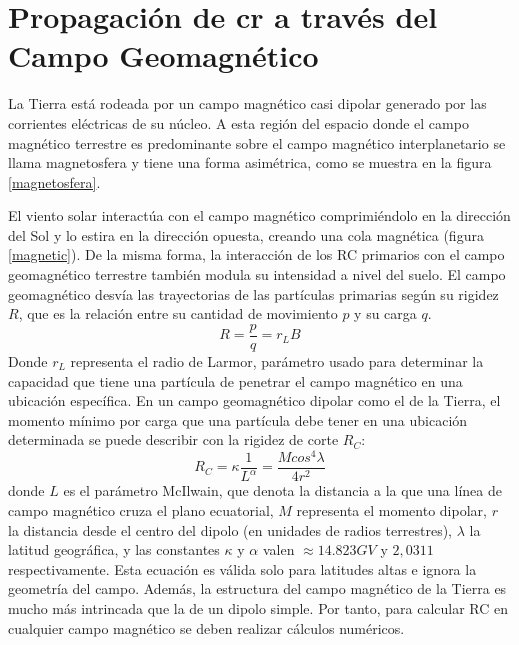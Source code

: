 \section{Propagación de \gls{cr} a través del Campo Geomagnético}

La Tierra está rodeada por un campo magnético casi dipolar generado por las corrientes eléctricas de su núcleo. A esta región del espacio donde el campo magnético terrestre es predominante sobre el campo magnético interplanetario se llama magnetosfera y tiene una forma asimétrica, como se muestra en la figura \ref{magnetosfera}. 

El viento solar interactúa con el campo magnético comprimiéndolo en la dirección del Sol y lo estira en la dirección opuesta, creando una cola magnética (figura \ref{magnetic}).  De la misma forma, la interacción de los RC primarios con el campo geomagnético terrestre también modula su intensidad a nivel del suelo. El campo geomagnético desvía las trayectorias de las partículas primarias según su rigidez $R$, que es la relación entre su cantidad de movimiento $p$ y su carga $q$. 
\begin{equation}
    R=\frac{p}{q}=r_{L}B
\end{equation}
Donde $r_L$ representa el radio de Larmor, parámetro usado para determinar la capacidad que tiene una partícula de penetrar el campo magnético en una ubicación específica. En un campo geomagnético dipolar como el de la Tierra, el momento mínimo por carga que una partícula debe tener en una ubicación determinada se puede describir con la rigidez de corte $R_C$:
\begin{equation}
    R_C=\kappa\frac{1}{L^{\alpha}}
    = \frac{M cos^{4}\lambda}{4r^{2}}
\end{equation}
donde $L$ es el parámetro McIlwain, que denota la distancia a la que una línea de campo magnético cruza el plano ecuatorial, $M$ representa el momento dipolar, $r$ la distancia desde el centro del dipolo (en unidades de radios terrestres), $\lambda$ la latitud geográfica, y las constantes $\kappa$ y $\alpha$ valen $\approx 14.823GV$ y  $2,0311$ respectivamente. Esta ecuación es válida solo para latitudes altas e ignora la geometría del campo. Además, la estructura del campo magnético de la Tierra es mucho más intrincada que la de un dipolo simple. Por tanto, para calcular RC en cualquier campo magnético se deben realizar cálculos numéricos.

